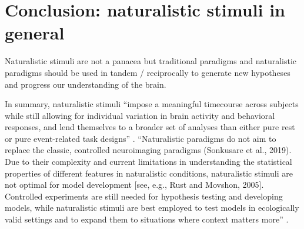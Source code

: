 \section{Conclusion: naturalistic stimuli in general}
%
Naturalistic stimuli are not a panacea but traditional paradigms and
naturalistic paradigms should be used in tandem / reciprocally to generate new
hypotheses and progress our understanding of the brain.


%
In summary, naturalistic stimuli ``impose a meaningful timecourse across
subjects while still allowing for individual variation in brain activity and
behavioral responses, and lend themselves to a broader set of analyses than
either pure rest or pure event-related task designs'' \citep{finn2017can}.
%
``Naturalistic paradigms do not aim to replace the classic, controlled
neuroimaging paradigms (Sonkusare et al., 2019). Due to their complexity and
current limitations in understanding the statistical properties of different
features in naturalistic conditions, naturalistic stimuli are not optimal for
model development [see, e.g., Rust and Movshon, 2005]. Controlled experiments
are still needed for hypothesis testing and developing models, while
naturalistic stimuli are best employed to test models in ecologically valid
settings and to expand them to situations where context matters
more'' \citep{saarimaki2021naturalistic}.
